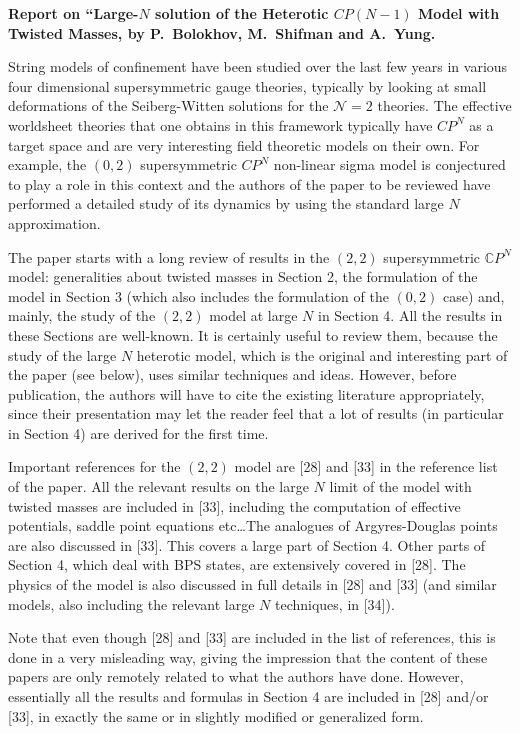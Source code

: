 \documentclass[12pt]{article}
\begin{document}

\noindent \textbf{Report on ``Large-$N$ solution of the Heterotic
$CP(N-1)$ Model with Twisted Masses, by P.\ Bolokhov, M.\ Shifman and
A.\ Yung.}

String models of confinement have been studied over the last few years
in various four dimensional supersymmetric gauge theories, typically
by looking at small deformations of the Seiberg-Witten solutions for
the $\mathcal{N}=2$ theories. The effective worldsheet theories that one
obtains in this framework typically have $CP^{N}$ as a target
space and are very interesting field theoretic models on their own.
For example, the $(0,2)$ supersymmetric $CP^{N}$ non-linear
sigma model is conjectured to play a role in this context and the
authors of the paper to be reviewed have performed a detailed study of
its dynamics by using the standard large $N$ approximation.

The paper starts with a long review of results in the $(2,2)$
supersymmetric $\mathbb CP^{N}$ model: generalities about twisted
masses in Section 2, the formulation of the model in Section 3 (which
also includes the formulation of the $(0,2)$ case) and, mainly, the
study of the $(2,2)$ model at large $N$ in Section 4. All the results
in these Sections are well-known. It is certainly useful to review
them, because the study of the large $N$ heterotic model, which is the
original and interesting part of the paper (see below), uses similar
techniques and ideas. However, before publication, the authors will
have to cite the existing literature appropriately, since their
presentation may let the reader feel that a lot of results (in
particular in Section 4) are derived for the first time.

Important references for the $(2,2)$ model are [28] and [33] in the
reference list of the paper. All the relevant results on the large $N$
limit of the model with twisted masses are included in [33], including
the computation of effective potentials, saddle point equations
etc\ldots The analogues of Argyres-Douglas points are also discussed
in [33]. This covers a large part of Section 4. Other parts of Section
4, which deal with BPS states, are extensively covered in [28]. The
physics of the model is also discussed in full details in [28] and
[33] (and similar models, also including the relevant large $N$
techniques, in [34]).

Note that even though [28] and [33] are included in the list of
references, this is done in a very misleading way, giving the
impression that the content of these papers are only remotely related
to what the authors have done. However, essentially all the results
and formulas in Section 4 are included in [28] and/or [33], in exactly
the same or in slightly modified or generalized form.
\end{document}
